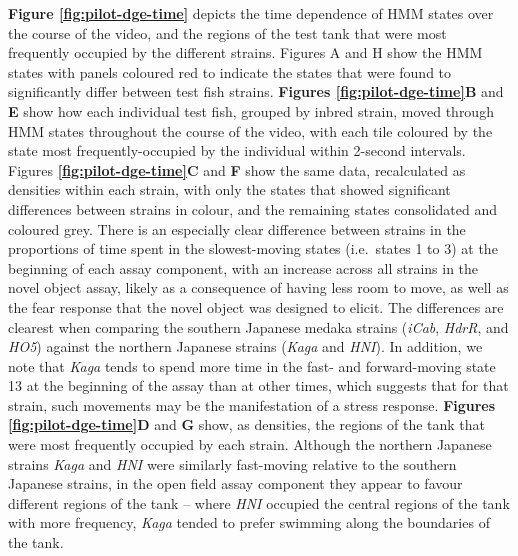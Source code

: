 \documentclass[
]{book}
\begin{document}
\textbf{Figure \ref{fig:pilot-dge-time}} depicts the time dependence of HMM states over the course of the video, and the regions of the test tank that were most frequently occupied by the different strains. Figures A and H show the HMM states with panels coloured red to indicate the states that were found to significantly differ between test fish strains. \textbf{Figures \ref{fig:pilot-dge-time}B} and \textbf{E} show how each individual test fish, grouped by inbred strain, moved through HMM states throughout the course of the video, with each tile coloured by the state most frequently-occupied by the individual within 2-second intervals. Figures \textbf{\ref{fig:pilot-dge-time}C} and \textbf{F} show the same data, recalculated as densities within each strain, with only the states that showed significant differences between strains in colour, and the remaining states consolidated and coloured grey. There is an especially clear difference between strains in the proportions of time spent in the slowest-moving states (i.e.~states 1 to 3) at the beginning of each assay component, with an increase across all strains in the novel object assay, likely as a consequence of having less room to move, as well as the fear response that the novel object was designed to elicit. The differences are clearest when comparing the southern Japanese medaka strains (\emph{iCab}, \emph{HdrR}, and \emph{HO5}) against the northern Japanese strains (\emph{Kaga} and \emph{HNI}). In addition, we note that \emph{Kaga} tends to spend more time in the fast- and forward-moving state 13 at the beginning of the assay than at other times, which suggests that for that strain, such movements may be the manifestation of a stress response. \textbf{Figures \ref{fig:pilot-dge-time}D} and \textbf{G} show, as densities, the regions of the tank that were most frequently occupied by each strain. Although the northern Japanese strains \emph{Kaga} and \emph{HNI} were similarly fast-moving relative to the southern Japanese strains, in the open field assay component they appear to favour different regions of the tank -- where \emph{HNI} occupied the central regions of the tank with more frequency, \emph{Kaga} tended to prefer swimming along the boundaries of the tank.
\end{document}
